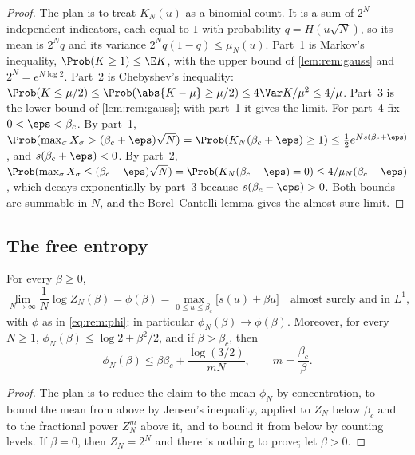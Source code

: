 \begin{refsection}
\begin{proof}
The plan is to treat $K_N(u)$ as a binomial count. It is a sum of $2^N$ independent indicators, each equal to $1$ with probability $q=H(u\sqrt N)$, so its mean is $2^Nq$ and its variance $2^Nq(1-q)\le\mu_N(u)$. Part~1 is Markov's inequality, $\Prob(K\ge1)\le\E K$, with the upper bound of \cref{lem:rem:gauss} and $2^N=e^{N\log2}$. Part~2 is Chebyshev's inequality: $\Prob(K\le\mu/2)\le\Prob(\abs{K-\mu}\ge\mu/2)\le4\Var K/\mu^2\le4/\mu$. Part~3 is the lower bound of \cref{lem:rem:gauss}; with part~1 it gives the limit. For part~4 fix $0<\eps<\beta_c$. By part~1, $\Prob(\max_\sigma X_\sigma>(\beta_c+\eps)\sqrt N)=\Prob(K_N(\beta_c+\eps)\ge1)\le\frac12e^{Ns(\beta_c+\eps)}$, and $s(\beta_c+\eps)<0$. By part~2, $\Prob(\max_\sigma X_\sigma\le(\beta_c-\eps)\sqrt N)=\Prob(K_N(\beta_c-\eps)=0)\le4/\mu_N(\beta_c-\eps)$, which decays exponentially by part~3 because $s(\beta_c-\eps)>0$. Both bounds are summable in $N$, and the Borel--Cantelli lemma gives the almost sure limit.
\end{proof}

\subsection{The free entropy}\label{sec:rem:fe}

\begin{theorem}\label{thm:rem:freeentropy}
For every $\beta\ge0$,
\[
\lim_{N\to\infty}\frac1N\log Z_N(\beta)=\phi(\beta)=\max_{0\le u\le\beta_c}\bigl[s(u)+\beta u\bigr]\quad\text{almost surely and in }L^1,
\]
with $\phi$ as in \eqref{eq:rem:phi}; in particular $\phi_N(\beta)\to\phi(\beta)$. Moreover, for every $N\ge1$, $\phi_N(\beta)\le\log2+\beta^2/2$, and if $\beta>\beta_c$, then
\begin{equation}\label{eq:rem:upper}
\phi_N(\beta)\le\beta\beta_c+\frac{\log(3/2)}{mN},\qquad m=\frac{\beta_c}\beta.
\end{equation}
\end{theorem}

\begin{proof}
The plan is to reduce the claim to the mean $\phi_N$ by concentration, to bound the mean from above by Jensen's inequality, applied to $Z_N$ below $\beta_c$ and to the fractional power $Z_N^m$ above it, and to bound it from below by counting levels. If $\beta=0$, then $Z_N=2^N$ and there is nothing to prove; let $\beta>0$.


\end{proof}
\end{refsection}
